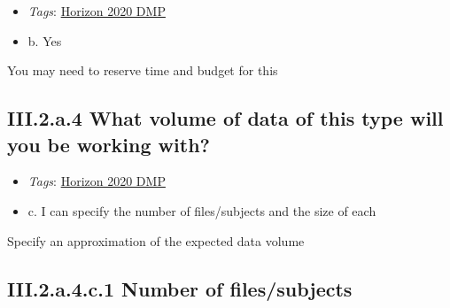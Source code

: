 \documentclass[a4paper,12pt]{report}
\begin{document}
\begin{itemize}
  \item \textit{Tags}: \ul{Horizon 2020 DMP}
  \end{itemize}




\begin{itemize}
  \item[\CheckmarkBold] b. Yes
\end{itemize}

\noindent
\begin{markdown}
You may need to reserve time and budget for this
\end{markdown}



\subsection*{\protect\textcolor{colorSecId}{III.2.a.4} What volume of data of this type will you be working with?}

\label{b1df3c74-0b1f-4574-81c4-4cc2d780c1af.b08fe063-33f8-4380-b3a9-ba1e586dedf2.df7ff410-748e-4704-b5b4-a06c4b269047.ba9e42fc-2bf5-413f-85de-003f981aaf81}


\begin{itemize}
  \item \textit{Tags}: \ul{Horizon 2020 DMP}
  \end{itemize}




\begin{itemize}
  \item[\CheckmarkBold] c. I can specify the number of files/subjects and the size of each
\end{itemize}

\noindent
\begin{markdown}
Specify an approximation of the expected data volume
\end{markdown}


\subsection*{\protect\textcolor{colorSecId}{III.2.a.4.c.1} Number of files/subjects}

\label{b1df3c74-0b1f-4574-81c4-4cc2d780c1af.b08fe063-33f8-4380-b3a9-ba1e586dedf2.df7ff410-748e-4704-b5b4-a06c4b269047.ba9e42fc-2bf5-413f-85de-003f981aaf81.24dbd191-2d0c-4267-b858-d9063b21a486.448403e9-578b-4155-9017-d4aa9119ea6a}
\end{document}
